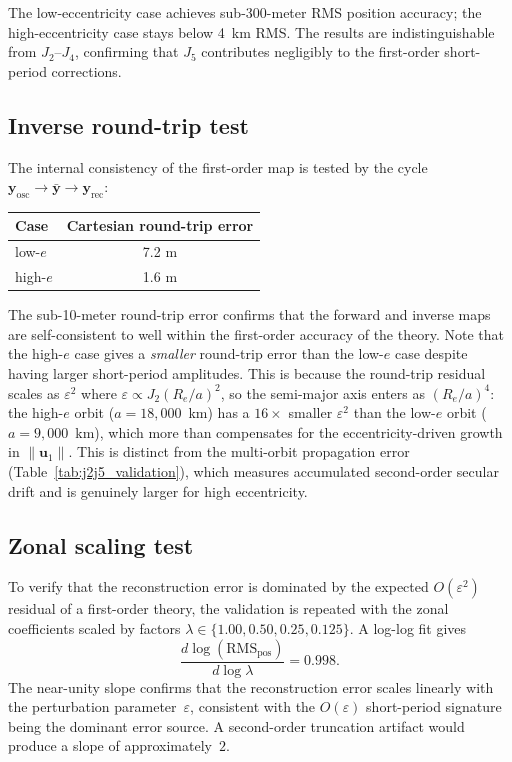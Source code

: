 \documentclass[11pt]{article}
\begin{document}
The low-eccentricity case achieves sub-300-meter RMS position accuracy; the
high-eccentricity case stays below 4~km RMS. The results are indistinguishable
from $J_2$--$J_4$, confirming that $J_5$ contributes negligibly to the
first-order short-period corrections.

\subsection{Inverse round-trip test}

The internal consistency of the first-order map is tested by the cycle
$\bm{y}_{\mathrm{osc}} \to \bar{\bm{y}} \to \bm{y}_{\mathrm{rec}}$:
\begin{center}
\begin{tabular}{lc}
\toprule
Case & Cartesian round-trip error \\
\midrule
low-$e$ & 7.2 m \\
high-$e$ & 1.6 m \\
\bottomrule
\end{tabular}
\end{center}
The sub-10-meter round-trip error confirms that the forward and inverse maps
are self-consistent to well within the first-order accuracy of the theory.
Note that the high-$e$ case gives a \emph{smaller} round-trip error than the
low-$e$ case despite having larger short-period amplitudes. This is because
the round-trip residual scales as $\varepsilon^2$ where
$\varepsilon \propto J_2(R_e/a)^2$, so the semi-major axis enters as
$(R_e/a)^4$: the high-$e$ orbit ($a = 18{,}000$~km) has a $16\times$ smaller
$\varepsilon^2$ than the low-$e$ orbit ($a = 9{,}000$~km), which more than
compensates for the eccentricity-driven growth in $\|\bm{u}_1\|$.
This is distinct from the multi-orbit propagation error
(Table~\ref{tab:j2j5_validation}), which measures accumulated second-order
secular drift and is genuinely larger for high eccentricity.

\subsection{Zonal scaling test}

To verify that the reconstruction error is dominated by the expected
$O(\varepsilon^2)$ residual of a first-order theory, the validation is repeated
with the zonal coefficients scaled by factors
$\lambda \in \{1.00, 0.50, 0.25, 0.125\}$. A log-log fit gives
\begin{equation}
\frac{d\log(\mathrm{RMS}_{\mathrm{pos}})}{d\log\lambda} = 0.998.
\label{eq:scaling_slope}
\end{equation}
The near-unity slope confirms that the reconstruction error scales linearly
with the perturbation parameter~$\varepsilon$, consistent with the
$O(\varepsilon)$ short-period signature being the dominant error source.
A second-order truncation artifact would produce a slope of approximately~$2$.
\end{document}
